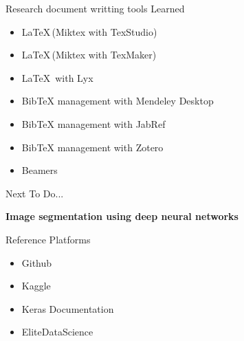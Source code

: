 \documentclass{beamer}
\begin{document}
\begin{frame}[t]{Research document writting tools Learned}
\begin{itemize}
\item \LaTeX \,(Miktex with TexStudio)
\item \LaTeX \,(Miktex with TexMaker)
\item \LaTeX \, with Lyx 
\item BibTeX management with Mendeley Desktop  
\item BibTeX management with JabRef
\item BibTeX management with Zotero
\item Beamers 
\end{itemize}
\end{frame}
\begin{frame}{Next To Do...}
\begin{center}
\Large{\textbf{Image segmentation using deep neural networks}}
\end{center}
\end{frame}
\begin{frame}[standout]{Reference Platforms}
\begin{itemize}
\item Github
\item Kaggle
\item Keras Documentation
\item EliteDataScience
\end{itemize}

\end{frame}
\end{document}
